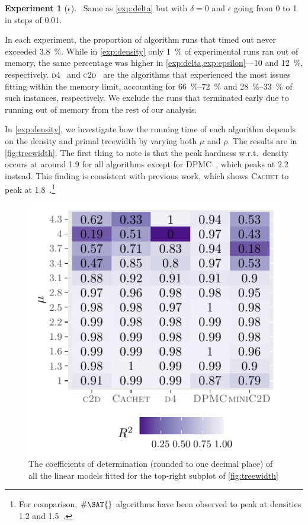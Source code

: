 \documentclass[letterpaper]{article} %
\theoremstyle{definition}
\newtheorem{experiment}{Experiment}
\theoremstyle{remark}
\begin{document}
\begin{experiment}[$\epsilon$]~\label{exp:epsilon}
  Same as \cref{exp:delta} but with $\delta = 0$ and $\epsilon$ going from 0 to
  1 in steps of 0.01.
\end{experiment}

In each experiment, the proportion of algorithm runs that timed out never
exceeded \SI{3.8}{\percent}. While in \cref{exp:density} only \SI{1}{\percent}
of experimental runs ran out of memory, the same percentage was higher in
\cref{exp:delta,exp:epsilon}---10 and \SI{12}{\percent}, respectively.
\textsc{d4}~\cite{DBLP:conf/ijcai/LagniezM17} and
\textsc{c2d}~\cite{DBLP:conf/ecai/Darwiche04} are the algorithms that
experienced the most issues fitting within the memory limit, accounting for
\SIrange{66}{72}{\percent} and \SIrange{28}{33}{\percent} of such instances,
respectively. We exclude the runs that terminated early due to running out of
memory from the rest of our analysis.

In \cref{exp:density}, we investigate how the running time of each algorithm
depends on the density and primal treewidth by varying both $\mu$ and $\rho$.
The results are in \cref{fig:treewidth}. The first thing to note is that the
peak hardness w.r.t.\ density occurs at around 1.9 for all algorithms except for
\textsc{DPMC}~\cite{DBLP:conf/cp/DudekPV20}, which peaks at 2.2 instead. This
finding is consistent with previous work, which shows \textsc{Cachet} to peak at
1.8~\cite{DBLP:conf/sat/SangBBKP04}.\footnote{For comparison, $\#\SAT{}$
  algorithms have been observed to peak at densities 1.2 and
  1.5~\cite{DBLP:conf/aaai/Pehoushek00}.}

\begin{figure}[t]
  \centering
  \includegraphics{r2}
  \caption{The coefficients of determination (rounded to one decimal place) of
    all the linear models fitted for the top-right subplot of
    \cref{fig:treewidth}}\label{fig:r2}
\end{figure}
\end{document}
